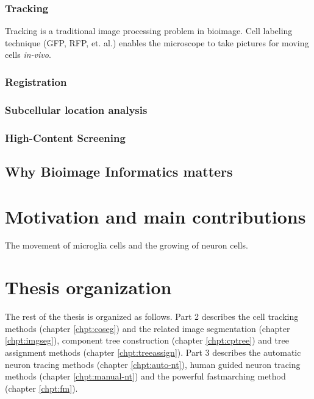 \subsubsection{Tracking}
Tracking is a traditional image processing problem in bioimage. Cell labeling technique (GFP, RFP, et. al.) enables the microscope to take pictures for moving cells \emph{in-vivo}.
\subsubsection{Registration}
\subsubsection{Subcellular location analysis}
\subsubsection{High-Content Screening}
\subsection{Why Bioimage Informatics matters}


\section{Motivation and main contributions}
The movement of microglia cells and the growing of neuron cells.
\section{Thesis organization}
The rest of the thesis is organized as follows. Part 2 describes the cell tracking methods (chapter \ref{chpt:coseg}) and the related image segmentation (chapter \ref{chpt:imgseg}), component tree construction (chapter \ref{chpt:cptree}) and tree assignment methods (chapter \ref{chpt:treeassign}). Part 3 describes the automatic neuron tracing methods (chapter \ref{chpt:auto-nt}), human guided neuron tracing methods (chapter \ref{chpt:manual-nt}) and the powerful fastmarching method (chapter \ref{chpt:fm}).

